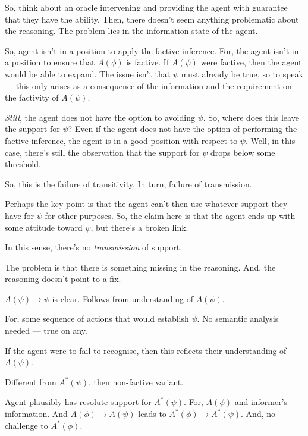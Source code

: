 \documentclass[10pt]{article}
\begin{document}
\begin{note}[Oracle]
  So, think about an oracle intervening and providing the agent with guarantee that they have the ability.
  Then, there doesn't seem anything problematic about the reasoning.
  The problem lies in the information state of the agent.
\end{note}

\begin{note}
  So, agent isn't in a position to apply the factive inference.
  For, the agent isn't in a position to ensure that \(A(\phi)\) is factive.
  If \(A(\psi)\) were factive, then the agent would be able to expand.
  The issue isn't that \(\psi\) must already be true, so to speak --- this only arises as a consequence of the information and the requirement on the factivity of \(A(\psi)\).

  \emph{Still}, the agent does not have the option to avoiding \(\psi\).
  So, where does this leave the support for \(\psi\)?
  Even if the agent does not have the option of performing the factive inference, the agent is in a good position with respect to \(\psi\).
  Well, in this case, there's still the observation that the support for \(\psi\) drops below some threshold.

  So, this is the failure of transitivity.
  In turn, failure of transmission.

  Perhaps the key point is that the agent can't then use whatever support they have for \(\psi\) for other purposes.
  So, the claim here is that the agent ends up with some attitude toward \(\psi\), but there's a broken link.

  In this sense, there's no \emph{transmission} of support.

  The problem is that there is something missing in the reasoning.
  And, the reasoning doesn't point to a fix.
\end{note}





\begin{note}
  \(A(\psi) \rightarrow \psi\) is clear.
  Follows from understanding of \(A(\psi)\).

  For, some sequence of actions that would establish \(\psi\).
  No semantic analysis needed --- true on any.

  If the agent were to fail to recognise, then this reflects their understanding of \(A(\psi)\).

  Different from \(A^{*}(\psi)\), then non-factive variant.

  Agent plausibly has resolute support for \(A^{*}(\psi)\).
  For, \(A(\phi)\) and informer's information.
  And \(A(\phi) \rightarrow A(\psi)\) leads to \(A^{*}(\phi) \rightarrow A^{*}(\psi)\).
  And, no challenge to \(A^{*}(\phi)\).
\end{note}
\end{document}

